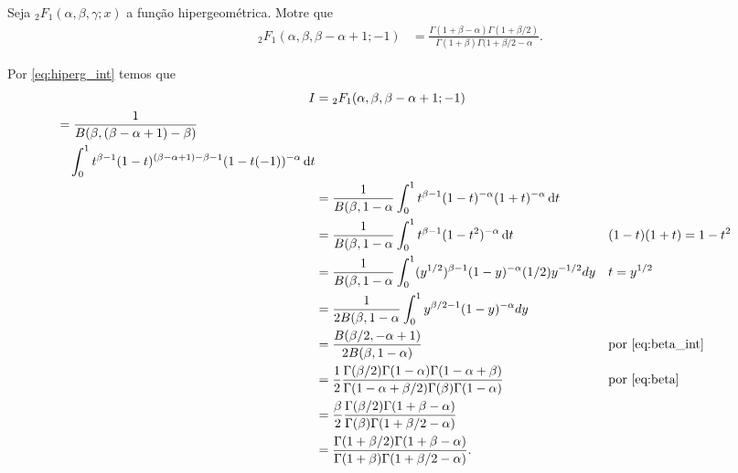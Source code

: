 \documentclass[a4paper,12pt, leqno, answers]{exam}
\begin{document}
\begin{questions}
    \question[P2 de 2011] Seja ${}_2F_1(\alpha, \beta, \gamma; x)$ a fun\c{c}\~{a}o hipergeom\'{e}trica. Motre que
    \begin{align*}
        {}_2F_1(\alpha, \beta, \beta - \alpha + 1; -1) &= \frac{\Gamma(1 + \beta - \alpha) \Gamma(1 + \beta/2)}{\Gamma(1 + \beta) \Gamma(1 + \beta/2 - \alpha}.
    \end{align*}
    \begin{solution}
        Por \eqref{eq:hiperg_int} temos que
        \begin{align*}
            I &= {}_2F_1(\alpha, \beta, \beta - \alpha + 1; -1) \\
            \begin{split}
                 &= \frac{1}{B(\beta, (\beta -\alpha + 1) - \beta)} \\ &\quad \int_0^1 t^{\beta - 1} (1 - t)^{(\beta - \alpha + 1) - \beta - 1} (1 - t(-1))^{-\alpha} \,\mathrm{d}t
            \end{split} \\
            &= \frac{1}{B(\beta, 1 - \alpha} \int_0^1 t^{\beta - 1} (1 - t)^{-\alpha} (1 + t)^{-\alpha} \,\mathrm{d}t \\
            &= \frac{1}{B(\beta, 1 - \alpha} \int_0^1 t^{\beta - 1} (1 - t^2)^{-\alpha} \,\mathrm{d}t && (1 - t)(1 + t) = 1 - t^2 \\
            &= \frac{1}{B(\beta, 1 - \alpha} \int_0^1 (y^{1/2})^{\beta - 1} (1 - y)^{-\alpha} (1 / 2) y^{-1/2} dy && t = y^{1/2} \\
            &= \frac{1}{2 B(\beta, 1 - \alpha} \int_0^1 y^{\beta / 2 - 1} (1 - y)^{-\alpha} dy \\
            &= \frac{B(\beta / 2, -\alpha + 1)}{2 B(\beta, 1 - \alpha)} && \text{por \eqref{eq:beta_int}} \\
            &= \frac{1}{2} \frac{\Gamma(\beta/2) \Gamma(1 - \alpha) \Gamma(1 - \alpha + \beta)}{\Gamma(1 - \alpha + \beta/2) \Gamma(\beta) \Gamma(1 - \alpha)} && \text{por \eqref{eq:beta}} \\
            &= \frac{\beta}{2} \frac{\Gamma(\beta / 2) \Gamma(1 + \beta - \alpha)}{\Gamma(\beta) \Gamma(1 + \beta / 2 - \alpha)} \\
            &= \frac{\Gamma(1 + \beta / 2) \Gamma(1 + \beta - \alpha)}{\Gamma(1 + \beta) \Gamma(1 + \beta / 2 - \alpha)}.
        \end{align*}
    \end{solution}


\end{questions}
\end{document}
